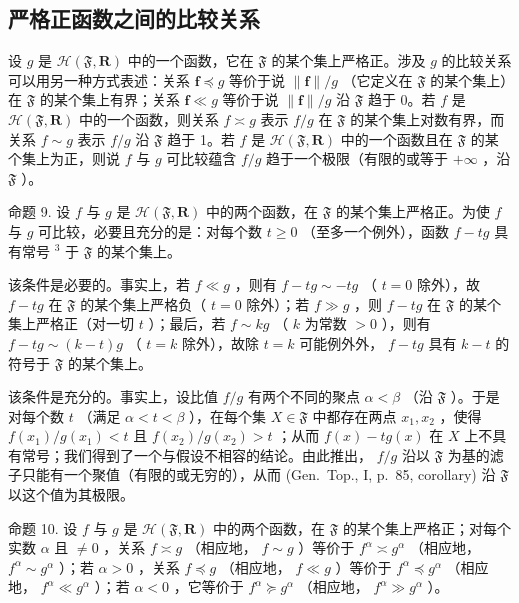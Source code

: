 \subsection{严格正函数之间的比较关系}

设 \(g\) 是 \(\mathcal{H}(\mathfrak{F},\mathbf{R})\) 中的一个函数，它在 \(\mathfrak{F}\) 的某个集上严格正。涉及 \(g\) 的比较关系可以用另一种方式表述：关系 \(\mathbf{f} \preccurlyeq g\) 等价于说 \(\| \mathbf{f}\| /g\) （它定义在 \(\mathfrak{F}\) 的某个集上）在 \(\mathfrak{F}\) 的某个集上有界；关系 \(\mathbf{f} \ll g\) 等价于说 \(\| \mathbf{f}\| /g\) 沿 \(\mathfrak{F}\) 趋于 0。若 \(f\) 是 \(\mathcal{H}(\mathfrak{F},\mathbf{R})\) 中的一个函数，则关系 \(f\asymp g\) 表示 \(f / g\) 在 \(\mathfrak{F}\) 的某个集上对数有界，而关系 \(f\sim g\) 表示 \(f / g\) 沿 \(\mathfrak{F}\) 趋于 1。若 \(f\) 是 \(\mathcal{H}(\mathfrak{F},\mathbf{R})\) 中的一个函数且在 \(\mathfrak{F}\) 的某个集上为正，则说 \(f\) 与 \(g\) 可比较蕴含 \(f / g\) 趋于一个极限（有限的或等于 \(+\infty\) ，沿 \(\mathfrak{F}\) ）。

命题 9. 设 \(f\) 与 \(g\) 是 \(\mathcal{H}(\mathfrak{F},\mathbf{R})\) 中的两个函数，在 \(\mathfrak{F}\) 的某个集上严格正。为使 \(f\) 与 \(g\) 可比较，必要且充分的是：对每个数 \(t \geqslant 0\) （至多一个例外），函数 \(f - tg\) 具有常号 \(^3\) 于 \(\mathfrak{F}\) 的某个集上。

该条件是必要的。事实上，若 \(f \ll g\) ，则有 \(f - tg \sim -tg\) （ \(t = 0\) 除外），故 \(f - tg\) 在 \(\mathfrak{F}\) 的某个集上严格负（ \(t = 0\) 除外）；若 \(f \gg g\) ，则 \(f - tg\) 在 \(\mathfrak{F}\) 的某个集上严格正（对一切 \(t\) ）；最后，若 \(f \sim kg\) （ \(k\) 为常数 \(> 0\) ），则有 \(f - tg \sim (k - t)g\) （ \(t = k\) 除外），故除 \(t = k\) 可能例外外， \(f - tg\) 具有 \(k - t\) 的符号于 \(\mathfrak{F}\) 的某个集上。

该条件是充分的。事实上，设比值 \(f / g\) 有两个不同的聚点 \(\alpha < \beta\) （沿 \(\mathfrak{F}\) ）。于是对每个数 \(t\) （满足 \(\alpha < t < \beta\) ），在每个集 \(X \in \mathfrak{F}\) 中都存在两点 \(x_{1}, x_{2}\) ，使得 \(f(x_{1}) / g(x_{1}) < t\) 且 \(f(x_{2}) / g(x_{2}) > t\) ；从而 \(f(x) - tg(x)\) 在 \(X\) 上不具有常号；我们得到了一个与假设不相容的结论。由此推出， \(f / g\) 沿以 \(\mathfrak{F}\) 为基的滤子只能有一个聚值（有限的或无穷的），从而 (Gen.~Top., I, p.~85, corollary) 沿 \(\mathfrak{F}\) 以这个值为其极限。

命题 10. 设 \(f\) 与 \(g\) 是 \(\mathcal{H}(\mathfrak{F},\mathbf{R})\) 中的两个函数，在 \(\mathfrak{F}\) 的某个集上严格正；对每个实数 \(\alpha\) 且 \(\neq 0\) ，关系 \(f\asymp g\) （相应地， \(f\sim g\) ）等价于 \(f^{\alpha}\asymp g^{\alpha}\) （相应地， \(f^{\alpha}\sim g^{\alpha}\) ）；若 \(\alpha >0\) ，关系 \(f\preccurlyeq g\) （相应地， \(f\ll g\) ）等价于 \(f^{\alpha}\preccurlyeq g^{\alpha}\) （相应地， \(f^{\alpha}\ll g^{\alpha}\) ）；若 \(\alpha < 0\) ，它等价于 \(f^{\alpha}\succcurlyeq g^{\alpha}\) （相应地， \(f^{\alpha}\gg g^{\alpha}\) ）。

